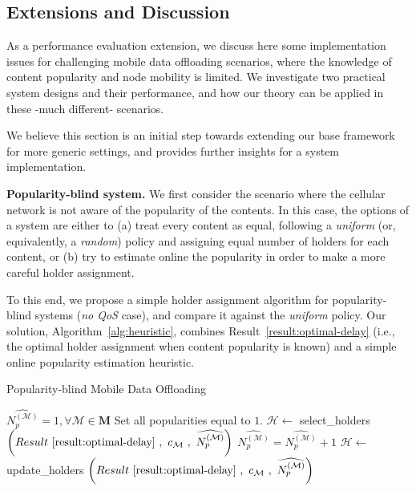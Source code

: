 \documentclass[journal]{IEEEtran}
\newcommand{\Np}{N_{p}^{(\mathcal{M})}}
\newcommand{\revisionRed}[1]{{#1}}\newcommand{\red}[1]{{#1}}
\begin{document}
\subsection{\revisionRed{Extensions and Discussion}}

\revisionRed{
As a performance evaluation extension, we discuss here some implementation issues for challenging mobile data offloading scenarios, where the knowledge of content popularity and node mobility is limited. We investigate two practical system designs and their performance, and how our theory can be applied in these -much different- scenarios. 
}

\revisionRed{
We believe this section is an initial step towards extending our base framework for more generic settings, and provides further insights for a system implementation.
}


\revisionRed{
\textbf{Popularity-blind system.} We first consider the scenario where the cellular network is not aware of the popularity of the contents. In this case, the options of a system are either to (a) treat every content as equal, following a \textit{uniform} (or, equivalently, a \textit{random}) policy and assigning equal number of holders for each content, or (b) try to estimate online the popularity in order to make a more careful holder assignment.
}

\revisionRed{
To this end, we propose a simple holder assignment algorithm for popularity-blind systems (\textit{no QoS} case), and compare it against the \textit{uniform} policy. Our solution, Algorithm~\ref{alg:heuristic}, combines Result~\ref{result:optimal-delay} (i.e., the optimal holder assignment when content popularity is known) and a simple online popularity estimation heuristic.
}


\revisionRed{
\begin{algorithm}[h]
\caption{Popularity-blind Mobile Data Offloading}
\begin{algorithmic}[1]
\State $\widehat{\Np}=1, \forall\mathcal{M}\in\textbf{M}$ \Comment Set all popularities equal to $1$.
\State $\mathcal{H}\leftarrow $ select\_holders $\left(Result~\ref{result:optimal-delay}~,~c_{\mathcal{M}}~,~\widehat{\Np}\right)$
\For {each content delivery of $\mathcal{M}$}
	\State $\widehat{\Np} = \widehat{\Np} +1$
	\State $\mathcal{H}\leftarrow $ update\_holders $\left(Result~\ref{result:optimal-delay}~,~c_{\mathcal{M}}~,~\widehat{\Np}\right)$
\EndFor
\end{algorithmic}
\label{alg:heuristic}
\end{algorithm}
}
\end{document}
